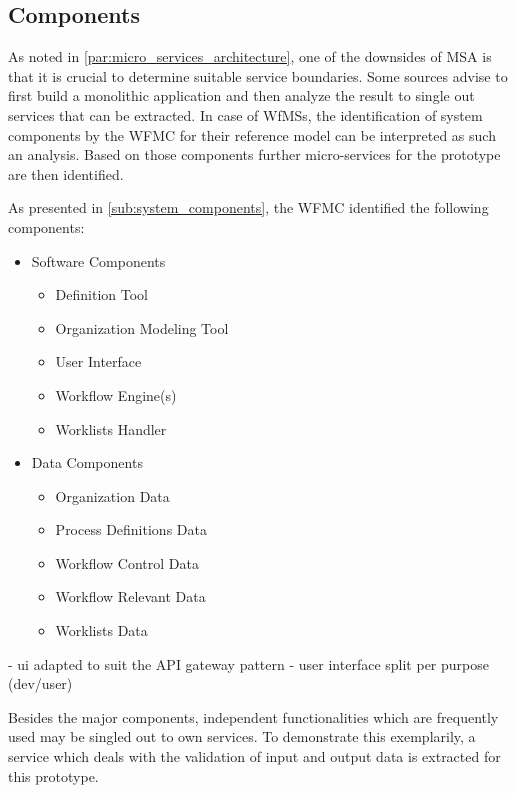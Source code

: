 \subsection{Components} %
\label{sub:components}
  As noted in \ref{par:micro_services_architecture}, one of the downsides of \ac{MSA} is that it is crucial to determine suitable service boundaries. Some sources advise to first build a monolithic application and then analyze the result to single out services that can be extracted. In case of \acp{WfMS}, the identification of system components by the \ac{WFMC} for their reference model can be interpreted as such an analysis. Based on those components further micro-services for the prototype are then identified.

  As presented in \ref{sub:system_components}, the \ac{WFMC} identified the following components:
    \begin{itemize}[nosep]
      \item Software Components
        \begin{itemize}[nosep]
          \item Definition Tool
          \item Organization Modeling Tool
          \item User Interface
          \item Workflow Engine(s)
          \item Worklists Handler
        \end{itemize}
      \item Data Components
        \begin{itemize}[nosep]
          \item Organization Data
          \item Process Definitions Data
          \item Workflow Control Data
          \item Workflow Relevant Data
          \item Worklists Data
        \end{itemize}
    \end{itemize}

    - ui adapted to suit the API gateway pattern
    - user interface split per purpose (dev/user)

  Besides the major components, independent functionalities which are frequently used may be singled out to own services. To demonstrate this exemplarily, a service which deals with the validation of input and output data is extracted for this prototype.

